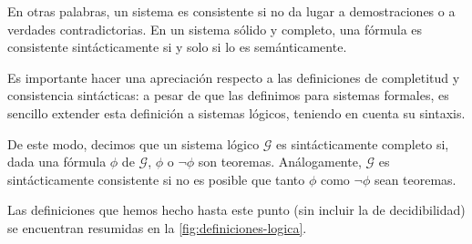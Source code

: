En otras palabras, un sistema es consistente si no da lugar a demostraciones o a verdades contradictorias. En un sistema sólido y completo, una fórmula es consistente sintácticamente si y solo si lo es semánticamente.

Es importante hacer una apreciación respecto a las definiciones de completitud y consistencia sintácticas: a pesar de que las definimos para sistemas formales, es sencillo extender esta definición a sistemas lógicos, teniendo en cuenta su sintaxis.

De este modo, decimos que un sistema lógico $\mathcal{G}$ es sintácticamente completo si, dada una fórmula $\phi$ de $\mathcal{G}$, $\phi$ o $\neg\phi$ son teoremas. Análogamente, $\mathcal{G}$ es sintácticamente consistente si no es posible que tanto $\phi$ como $\neg\phi$ sean teoremas.

Las definiciones que hemos hecho hasta este punto (sin incluir la de decidibilidad) se encuentran resumidas en la \cref{fig:definiciones-logica}.




%

